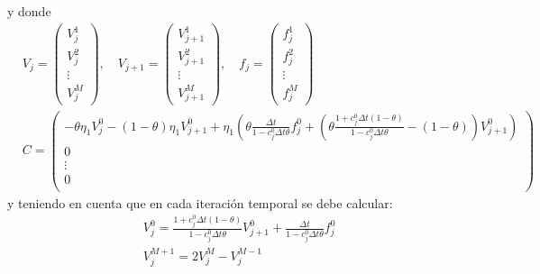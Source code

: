 y donde
\begin{align*}
    &\boxed{
        V_j = \begin{pmatrix}
            V_j^1 \\
            V_j^2 \\
            \vdots \\
            V_j^M
        \end{pmatrix}, \quad
        V_{j+1} = \begin{pmatrix}
            V_{j+1}^1 \\
            V_{j+1}^2 \\
            \vdots \\
            V_{j+1}^M
        \end{pmatrix}, \quad
        f_j = \begin{pmatrix}
            f_j^1 \\
            f_j^2 \\
            \vdots \\
            f_j^M
        \end{pmatrix}
    } \\
    &\boxed{
        C = \begin{pmatrix}
            -\theta\eta_1 V_j^{0} - (1-\theta)\eta_1 V_{j+1}^{0} + \eta_1 \left( \theta\frac{\Delta t}{1 - c_j^0 \Delta t \theta} f_j^0 + \left( \theta \frac{1 + c_j^0 \Delta t (1-\theta)}{1 - c_j^0 \Delta t \theta} - (1-\theta) \right) V_{j+1}^{0} \right) \\
            0 \\
            \vdots \\
            0 \\
        \end{pmatrix}
    }
\end{align*}
y teniendo en cuenta que en cada iteración temporal se debe calcular:
\begin{align*}
    &\boxed{V_j^0 = \frac{1 + c_j^0 \Delta t (1-\theta)}{1 - c_j^0 \Delta t \theta} V_{j+1}^0 + \frac{\Delta t}{1 - c_j^0 \Delta t \theta} f_j^0} \\
    &\boxed{V_j^{M+1} = 2V_j^{M} - V_j^{M-1}}
\end{align*}











\newpage




